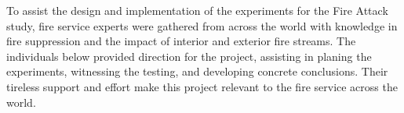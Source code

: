 \documentclass[12pt,oneside]{book}
\begin{document}
\clearpage

To assist the design and implementation of the experiments for the Fire Attack study, fire service experts were gathered from across the world with knowledge in fire suppression and the impact of interior and exterior fire streams. The individuals below provided direction for the project, assisting in planing the experiments, witnessing the testing, and developing concrete conclusions. Their tireless support and effort make this project relevant to the fire service across the world. 

\end{document}
